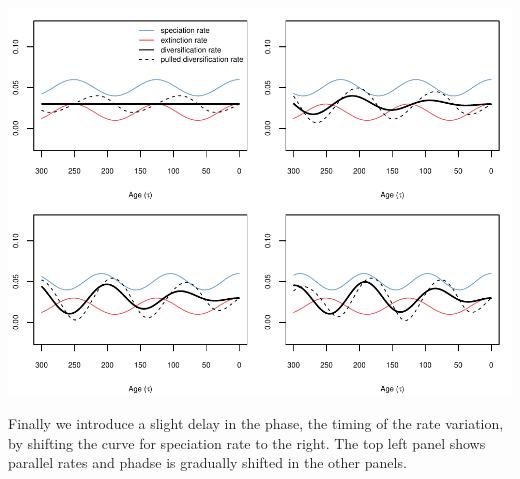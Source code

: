 \documentclass[
]{article}
\begin{document}
\includegraphics{supplement_files/figure-latex/unnamed-chunk-23-1.pdf}

\pagebreak

Finally we introduce a slight delay in the phase, the timing of the rate
variation, by shifting the curve for speciation rate to the right. The
top left panel shows parallel rates and phadse is gradually shifted in
the other panels.
\end{document}
